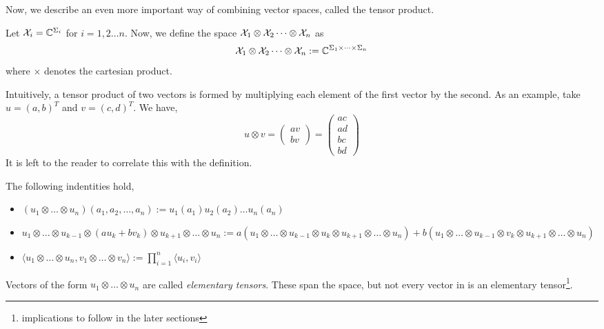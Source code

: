 Now, we describe an even more important way of combining vector spaces, called the tensor product.
\begin{definition}
Let $\mathcal{X}_i = \mathbb{C}^{\Sigma_i}$ for $i = 1,2 \dots n$. Now, we define the space $\mathcal{X}_1\otimes\mathcal{X}_2\dots\otimes\mathcal{X}_n$ as
\[\mathcal{X}_1\otimes\mathcal{X}_2\dots\otimes\mathcal{X}_n := \mathbb{C}^{\Sigma_1\times\dots\times\Sigma_n}\]
where $\times$ denotes the cartesian product.
\end{definition}\noindent 
Intuitively, a tensor product of two vectors is formed by multiplying each element of the first vector by the second. As an example, take $u = (a,b)^T$ and $v = (c,d)^T$. We have, 
\[u\otimes v = \begin{pmatrix}av \\ bv\end{pmatrix} = \begin{pmatrix}ac \\ ad\\ bc\\bd\end{pmatrix}\]
It is left to the reader to correlate this with the definition.

\noindent 
The following indentities hold,
\begin{itemize}
    \item $(u_1\otimes\dots\otimes u_n)(a_1,a_2,\dots,a_n) := u_1(a_1)u_2(a_2)\dots u_n(a_n)$
    \item $u_1\otimes\dots\otimes u_{k-1}\otimes(au_k+bv_k)\otimes u_{k+1} \otimes\dots\otimes u_n 
    := a(u_1\otimes\dots\otimes u_{k-1}\otimes u_k\otimes u_{k+1} \otimes\dots\otimes u_n ) + b(u_1\otimes\dots\otimes u_{k-1}\otimes v_k\otimes u_{k+1} \otimes\dots\otimes u_n )$
    \item $\langle u_1\otimes\dots\otimes u_n,v_1\otimes\dots\otimes v_n\rangle := \prod_{i=1}^{n} \langle u_i,v_i\rangle$
\end{itemize}
Vectors of the form $ u_1\otimes\dots\otimes u_n$ are called \textit{elementary tensors}. These span the space, but not every vector in is an elementary tensor\footnote{implications to follow in the later sections}.
